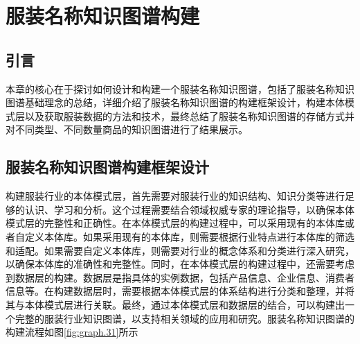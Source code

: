 \documentclass[bachelor_p]{hdu-thesis}
\begin{document}






\chapter{服装名称知识图谱构建}
\section{引言}
本章的核心在于探讨如何设计和构建一个服装名称知识图谱，包括了服装名称知识图谱基础理念的总结，详细介绍了服装名称知识图谱的构建框架设计，构建本体模式层以及获取服装数据的方法和技术，最终总结了服装名称知识图谱的存储方式并对不同类型、不同数量商品的知识图谱进行了结果展示。

\section{服装名称知识图谱构建框架设计}
构建服装行业的本体模式层，首先需要对服装行业的知识结构、知识分类等进行足够的认识、学习和分析。这个过程需要结合领域权威专家的理论指导，以确保本体模式层的完整性和正确性。在本体模式层的构建过程中，可以采用现有的本体库或者自定义本体库。如果采用现有的本体库，则需要根据行业特点进行本体库的筛选和适配。如果需要自定义本体库，则需要对行业的概念体系和分类进行深入研究，以确保本体库的准确性和完整性。同时，在本体模式层的构建过程中，还需要考虑到数据层的构建。数据层是指具体的实例数据，包括产品信息、企业信息、消费者信息等。在构建数据层时，需要根据本体模式层的体系结构进行分类和整理，并将其与本体模式层进行关联。最终，通过本体模式层和数据层的结合，可以构建出一个完整的服装行业知识图谱，以支持相关领域的应用和研究。服装名称知识图谱的构建流程如图\ref{fig:graph.31}所示
\end{document}
